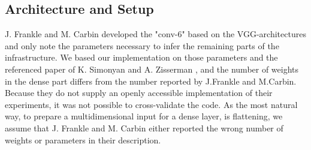 \subsection*{Architecture and Setup}
J. Frankle and M. Carbin developed the "conv-6" based on the VGG-architectures and only note the parameters necessary to infer the remaining parts of the infrastructure.\cite{LTH}
We based our implementation on those parameters and the referenced paper of K. Simonyan and A. Zisserman \cite{VGG16}, and the number of weights in the dense part differs from the number reported by J.Frankle and M.Carbin. Because they do not supply an openly accessible implementation of their experiments, it was not possible to cross-validate the code.
As the most natural way, to prepare a multidimensional input for a dense layer, is flattening, we assume that J. Frankle and M. Carbin either reported the wrong number of weights or parameters in their description.
